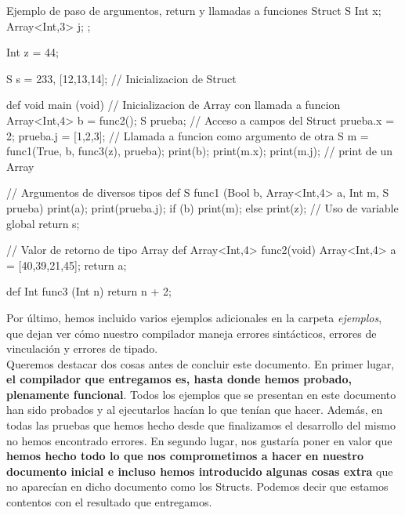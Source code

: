 \documentclass[12pt,onecolumn]{article}
\begin{document}
		\begin{wgetlisting}{Ejemplo de paso de argumentos, return y llamadas a funciones}
Struct S {
	Int x;
	Array<Int,3> j;
};

Int z = 44;

S s = {233, [12,13,14]}; // Inicializacion de Struct

def void main (void){
	// Inicializacion de Array con llamada a funcion
	Array<Int,4> b = func2();
	S prueba;
	// Acceso a campos del Struct
	prueba.x = 2;
	prueba.j = [1,2,3];
	// Llamada a funcion como argumento de otra
	S m = func1(True, b, func3(z), prueba);
	print(b);
	print(m.x);
	print(m.j);	// print de un Array
}

// Argumentos de diversos tipos
def S func1 (Bool b, Array<Int,4> a, Int m, S prueba) {
	print(a);
	print(prueba.j);
	if (b) { print(m); } else { }			
	print(z);	// Uso de variable global
	return s;
}

// Valor de retorno de tipo Array
def Array<Int,4> func2(void) { 
	Array<Int,4> a = [40,39,21,45];
	return a;
}

def Int func3 (Int n) {
	return n + 2;
}
		\end{wgetlisting}
		
		\vspace{\baselineskip}
		\vspace{\baselineskip}
		\newpage
		
		Por último, hemos incluido varios ejemplos adicionales en la carpeta \textit{ejemplos}, que dejan ver cómo nuestro compilador maneja errores sintácticos, errores de vinculación y errores de tipado. \\
		
		Queremos destacar dos cosas antes de concluir este documento. En primer lugar, \textbf{el compilador que entregamos es, hasta donde hemos probado, plenamente funcional}. Todos los ejemplos que se presentan en este documento han sido probados y al ejecutarlos hacían lo que tenían que hacer. Además, en todas las pruebas que hemos hecho desde que finalizamos el desarrollo del mismo no hemos encontrado errores.  En segundo lugar, nos gustaría poner en valor que \textbf{hemos hecho todo lo que nos comprometimos a hacer en nuestro documento inicial e incluso hemos introducido algunas cosas extra} que no aparecían en dicho documento como los Structs. Podemos decir que estamos contentos con el resultado que entregamos.
		
\end{document}
